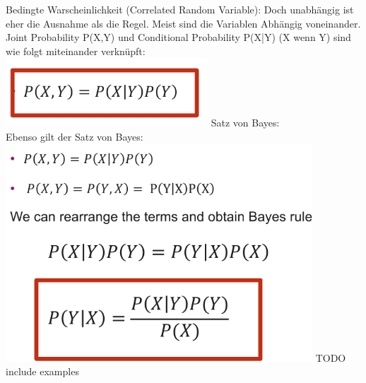 \textcolor{myblue}{Bedingte Warscheinlichkeit (Correlated Random Variable):}
Doch unabhängig ist eher die Ausnahme als die Regel. Meist sind die Variablen Abhängig voneinander. \\
Joint Probability P(X,Y) und Conditional Probability P(X|Y) (X wenn Y) sind wie folgt miteinander verknüpft:\\
\includegraphics[width=\linewidth]{img/correlated_random_variable.png}
\textcolor{myblue}{Satz von Bayes:}\\
Ebenso gilt der Satz von Bayes:\\
\includegraphics[width=\linewidth]{img/bayes.png}
TODO include examples